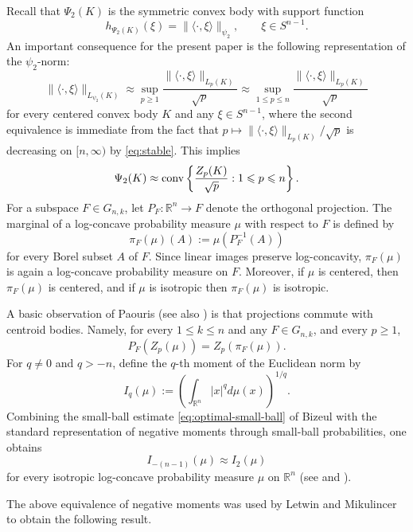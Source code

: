 \documentclass[11pt,leqno]{article}
\theoremstyle{definition}
\numberwithin{equation}{section}
\newcommand{\ls}{\leqslant}
\newcommand{\gr}{\geqslant}
\begin{document}
Recall that $\Psi_2(K)$ is the symmetric convex body with support function
\[ h_{\Psi_2(K)}(\xi)=\|\langle \cdot,\xi\rangle\|_{\psi_2},\qquad \xi\in S^{n-1}.\]
An important consequence for the present paper is the following representation of the $\psi_2$-norm:
\[\|\langle \cdot ,\xi\rangle\|_{L_{\psi_2}(K)}\approx\sup_{p\gr1}\frac{\|\langle \cdot ,\xi\rangle\|_{L_p(K)}}{\sqrt p}\approx
\sup_{1\ls p\ls n}\frac{\|\langle \cdot ,\xi\rangle\|_{L_p(K)}}{\sqrt p}\]
for every centered convex body $K$ and any $\xi\in S^{n-1}$, where the second equivalence is immediate from 
the fact that $p\mapsto \|\langle \cdot ,\xi\rangle\|_{L_p(K)}/\sqrt p$ is decreasing on $[n,\infty)$ by \eqref{eq:stable}. This implies
\begin{equation}\label{eq:convex-hull}\Psi_2(K )\approx{\rm conv}\left\{\frac{Z_p(K)}{\sqrt{p}}: 1\ls p\ls n\right\}.\end{equation} 
For a subspace $F \in G_{n,k}$, let $P_F:\mathbb{R}^n\to F$ denote the orthogonal projection. The marginal of a log-concave probability
measure $\mu$ with respect to $F$ is defined by
\begin{equation*}\pi_F(\mu)(A):=\mu(P_F^{-1}(A))
\end{equation*}for every Borel subset $A$ of $F$. Since linear images preserve log-concavity, $\pi_F(\mu)$ is again a log-concave probability
measure on $F$. Moreover, if $\mu$ is centered, then $\pi_F(\mu)$ is centered, and if $\mu$ is isotropic then
$\pi_F(\mu)$ is isotropic.

A basic observation of Paouris \cite{Paouris-GAFA} (see also \cite[Theorem~5.1.12]{BGVV-book}) is that projections commute with centroid bodies. Namely, 
for every $1\ls k\ls n$ and any $F \in G_{n,k}$, and every $p\gr 1$,
\begin{equation}\label{eq:marginal-Zq}
P_F(Z_p(\mu)) = Z_p(\pi_F(\mu)).
\end{equation}
For $q\neq 0$ and $q>-n$, define the $q$-th moment of the Euclidean norm by
\[I_q(\mu ):=\left( \int_{\mathbb{R}^n} |x|^q d\mu (x)\right)^{1/q}.\]
Combining the small-ball estimate \eqref{eq:optimal-small-ball} of 
Bizeul \cite{Bizeul-2025} with the standard representation of negative moments through small-ball probabilities, one obtains
\[I_{-(n-1)}(\mu)\approx I_2(\mu)\] 
for every isotropic log-concave probability measure $\mu$ on $\mathbb{R}^n$ (see \cite{Dafnis-Paouris-2010} and \cite[Theorem~6.9]{Giannopoulos-Pafis-Tziotziou-2025}).

The above equivalence of negative moments was used by Letwin and
Mikulincer \cite[Proposition~2.4]{Letwin-Mikulincer-2026} to obtain the following result.
\end{document}
